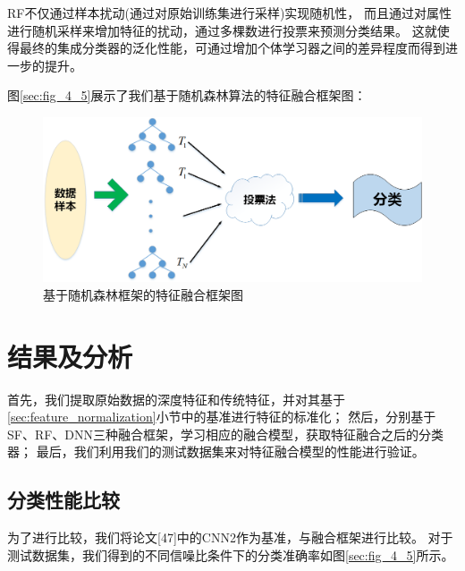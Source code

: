 RF不仅通过样本扰动(通过对原始训练集进行采样)实现随机性，
而且通过对属性进行随机采样来增加特征的扰动，通过多棵数进行投票来预测分类结果。
这就使得最终的集成分类器的泛化性能，可通过增加个体学习器之间的差异程度而得到进一步的提升。\par
图\ref{sec:fig_4_5}展示了我们基于随机森林算法的特征融合框架图：
\begin{figure}[!h]
	\centering
	\includegraphics[scale=0.5]{figures/chapter_4/fig_4_4}
	\caption{基于随机森林框架的特征融合框架图}\label{sec:fig_4_4}
\end{figure}

\section{结果及分析}
首先，我们提取原始数据的深度特征和传统特征，并对其基于\ref{sec:feature_normalization}小节中的基准进行特征的标准化；
然后，分别基于SF、RF、DNN三种融合框架，学习相应的融合模型，获取特征融合之后的分类器；
最后，我们利用我们的测试数据集来对特征融合模型的性能进行验证。\par

\subsection{分类性能比较}

为了进行比较，我们将论文[47]中的CNN2作为基准，与融合框架进行比较。
对于测试数据集，我们得到的不同信噪比条件下的分类准确率如图\ref{sec:fig_4_5}所示。\par

